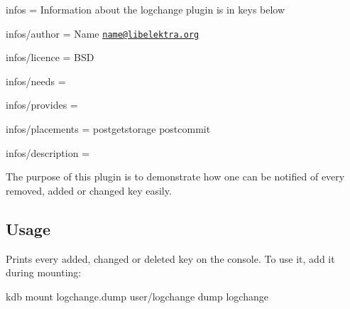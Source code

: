 
\begin{DoxyItemize}
\item infos = Information about the logchange plugin is in keys below
\item infos/author = Name \href{mailto:name@libelektra.org}{\tt name@libelektra.\+org}
\item infos/licence = B\+S\+D
\item infos/needs =
\item infos/provides =
\item infos/placements = postgetstorage postcommit
\item infos/description =
\end{DoxyItemize}

The purpose of this plugin is to demonstrate how one can be notified of every removed, added or changed key easily.

\subsection*{Usage}

Prints every added, changed or deleted key on the console. To use it, add it during mounting\+: \begin{DoxyVerb}kdb mount logchange.dump user/logchange dump logchange\end{DoxyVerb}
 